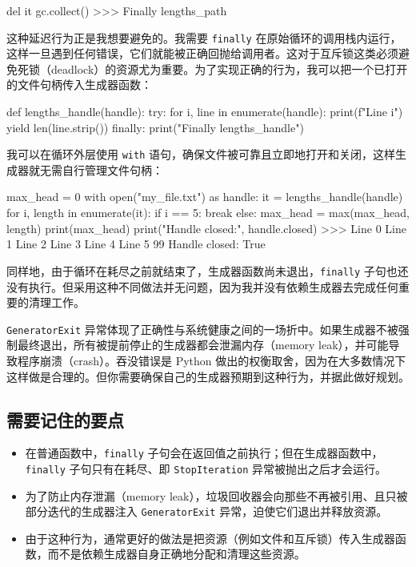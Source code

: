\begin{codebox}[python]
del it
gc.collect()
>>>
Finally lengths_path
\end{codebox}

这种延迟行为正是我想要避免的。我需要 \texttt{finally} 在原始循环的调用栈内运行，这样一旦遇到任何错误，它们就能被正确回抛给调用者。这对于互斥锁这类必须避免死锁（deadlock）的资源尤为重要。为了实现正确的行为，我可以把一个已打开的文件句柄传入生成器函数：

\begin{codebox}[python]
def lengths_handle(handle):
    try:
        for i, line in enumerate(handle):
            print(f"Line {i}")
            yield len(line.strip())
    finally:
        print("Finally lengths_handle")
\end{codebox}

我可以在循环外层使用 \texttt{with} 语句，确保文件被可靠且立即地打开和关闭，这样生成器就无需自行管理文件句柄：

\begin{codebox}[python]
max_head = 0
with open("my_file.txt") as handle:
    it = lengths_handle(handle)
    for i, length in enumerate(it):
        if i == 5:
            break
        else:
            max_head = max(max_head, length)
print(max_head)
print("Handle closed:", handle.closed)
>>>
Line 0
Line 1
Line 2
Line 3
Line 4
Line 5
99
Handle closed: True
\end{codebox}

同样地，由于循环在耗尽之前就结束了，生成器函数尚未退出，\texttt{finally} 子句也还没有执行。但采用这种不同做法并无问题，因为我并没有依赖生成器去完成任何重要的清理工作。

\texttt{GeneratorExit} 异常体现了正确性与系统健康之间的一场折中。如果生成器不被强制最终退出，所有被提前停止的生成器都会泄漏内存（memory leak），并可能导致程序崩溃（crash）。吞没错误是 Python 做出的权衡取舍，因为在大多数情况下这样做是合理的。但你需要确保自己的生成器预期到这种行为，并据此做好规划。

\subsection{需要记住的要点}

\begin{itemize}
\item 在普通函数中，\texttt{finally} 子句会在返回值之前执行；但在生成器函数中，\texttt{finally} 子句只有在耗尽、即 \texttt{StopIteration} 异常被抛出之后才会运行。
\item 为了防止内存泄漏（memory leak），垃圾回收器会向那些不再被引用、且只被部分迭代的生成器注入 \texttt{GeneratorExit} 异常，迫使它们退出并释放资源。
\item 由于这种行为，通常更好的做法是把资源（例如文件和互斥锁）传入生成器函数，而不是依赖生成器自身正确地分配和清理这些资源。
\end{itemize}

